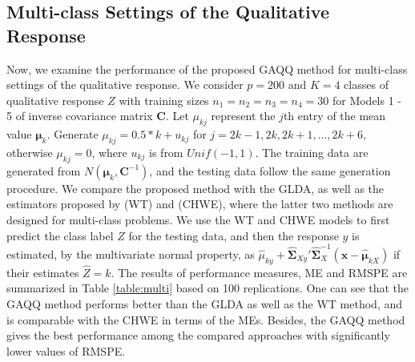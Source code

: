 \documentclass[12pt]{article}
\begin{document}
\subsection{Multi-class Settings of the Qualitative Response}

Now, we examine the performance of the proposed GAQQ method for multi-class settings of the qualitative response.
We consider $p = 200$ and $K = 4$ classes of qualitative response $Z$
with training sizes $n_1 = n_2 = n_3 = n_4 = 30$ for Models 1 - 5 of inverse covariance matrix $\bm C$.
Let $\mu_{kj}$ represent the $j$th entry of the mean value $\bm \mu_k$.
Generate $\mu_{kj} = 0.5 * k + u_{kj}$ for $j = 2k - 1, 2k, 2k + 1, \ldots, 2k + 6$, otherwise $\mu_{kj} = 0$, where $u_{kj}$ is from $Unif(-1, 1)$.
The training data are generated from $N(\bm \mu_k, \bm C^{-1})$,
and the testing data follow the same generation procedure.
We compare the proposed method with the GLDA, as well as the estimators proposed by  \cite{Witten2011Penalized} (WT) and \cite{Clemmensen2011Sparse} (CHWE),
where the latter two methods are designed for multi-class problems.
We use the WT and CHWE models to first predict the class label $Z$ for the testing data, and then the response $y$ is estimated, by the multivariate normal property, as $\hat{\mu}_{ky} + \hat{\bm \Sigma}_{Xy}' \hat{\bm \Sigma}_{X}^{-1} (\bm x - \hat{\bm \mu}_{kX})$ if their estimates $\hat{Z} = k$.
The results of performance measures, ME and RMSPE are summarized in Table \ref{table:multi} based on 100 replications.
One can see that the GAQQ method performs better than the GLDA as well as the WT method,
and is comparable with the CHWE in terms of the MEs.
Besides, the GAQQ method gives the best performance among the compared approaches with significantly lower values of RMSPE.
\end{document}
